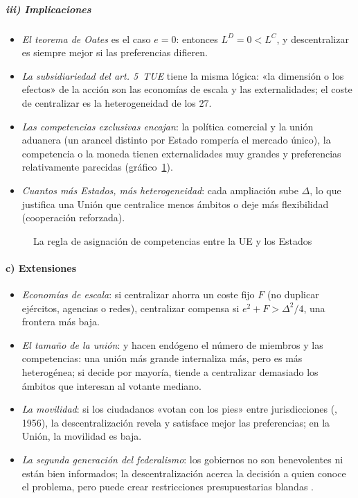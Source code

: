 \documentclass[11pt]{article}
\begin{document}
\subparagraph{iii) Implicaciones}

\begin{itemize}
\item \emph{El teorema de Oates} es el caso $e=0$: entonces $L^{D}=0<L^{C}$, y descentralizar es siempre mejor si las preferencias difieren.
\item \emph{La subsidiariedad del art. 5~TUE} tiene la misma lógica: «la dimensión o los efectos» de la acción son las economías de escala y las externalidades; el coste de centralizar es la heterogeneidad de los 27.
\item \emph{Las competencias exclusivas encajan}: la política comercial y la unión aduanera (un arancel distinto por Estado rompería el mercado único), la competencia o la moneda tienen externalidades muy grandes y preferencias relativamente parecidas (gráfico~\ref{fig:asignacion}).
\item \emph{Cuantos más Estados, más heterogeneidad}: cada ampliación sube $\Delta$, lo que justifica una Unión que centralice menos ámbitos o deje más flexibilidad (cooperación reforzada).
\end{itemize}

\begin{figure}[H]
\centering
\caption{La regla de asignación de competencias entre la UE y los Estados}\label{fig:asignacion}
\end{figure}

\paragraph{c) Extensiones}

\begin{itemize}
\item \emph{Economías de escala}: si centralizar ahorra un coste fijo $F$ (no duplicar ejércitos, agencias o redes), centralizar compensa si $e^2+F>\Delta^2/4$, una frontera más baja.
\item \emph{El tamaño de la unión}: \textcite{AlesinaSpolaore2003Size} y \textcite{AlesinaAngeloniEtro2005} hacen endógeno el número de miembros y las competencias: una unión más grande internaliza más, pero es más heterogénea; si decide por mayoría, tiende a centralizar demasiado los ámbitos que interesan al votante mediano.
\item \emph{La movilidad}: si los ciudadanos «votan con los pies» entre jurisdicciones (, 1956), la descentralización revela y satisface mejor las preferencias\nocite{Tiebout1956Pure}; en la Unión, la movilidad es baja.
\item \emph{La segunda generación del federalismo}: los gobiernos no son benevolentes ni están bien informados; la descentralización acerca la decisión a quien conoce el problema, pero puede crear restricciones presupuestarias blandas\nocite{Oates1999Essay} .
\end{itemize}
\end{document}
